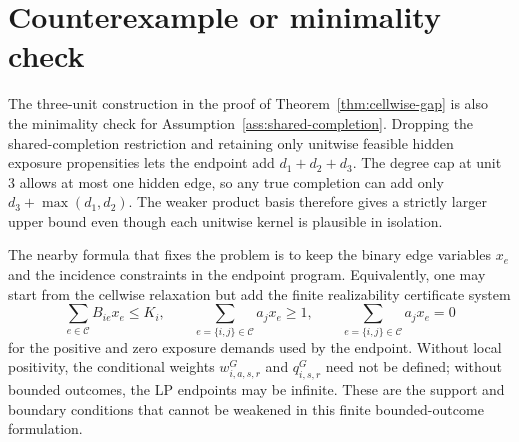 \documentclass[11pt]{article}
\theoremstyle{definition}
\theoremstyle{plain}
\theoremstyle{remark}
\begin{document}
\section{Counterexample or minimality check}
The three-unit construction in the proof of Theorem~\ref{thm:cellwise-gap} is
also the minimality check for Assumption~\ref{ass:shared-completion}.  Dropping
the shared-completion restriction and retaining only unitwise feasible hidden
exposure propensities lets the endpoint add \(d_1+d_2+d_3\).  The degree cap at
unit \(3\) allows at most one hidden edge, so any true completion can add only
\(d_3+\max(d_1,d_2)\).  The weaker product basis therefore gives a strictly
larger upper bound even though each unitwise kernel is plausible in isolation.

The nearby formula that fixes the problem is to keep the binary edge variables
\(x_e\) and the incidence constraints in the endpoint program.  Equivalently,
one may start from the cellwise relaxation but add the finite realizability
certificate system
\[
\sum_{e\in\mathcal C}B_{ie}x_e\le K_i,\qquad
\sum_{e=\{i,j\}\in\mathcal C}a_jx_e\ge1,\qquad
\sum_{e=\{i,j\}\in\mathcal C}a_jx_e=0
\]
for the positive and zero exposure demands used by the endpoint.  Without local
positivity, the conditional weights \(w^G_{i,a,s,r}\) and \(q^G_{i,s,r}\) need
not be defined; without bounded outcomes, the LP endpoints may be infinite.
These are the support and boundary conditions that cannot be weakened in this
finite bounded-outcome formulation.
\end{document}
